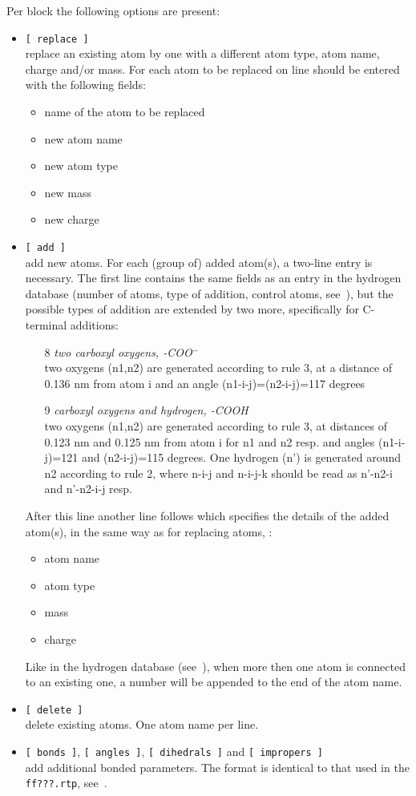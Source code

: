 Per block the following options are present:
\begin{itemize}
\item {\tt [~replace~]} \\
replace an existing atom by one with a different atom type, atom name,
charge and/or mass. For each atom to be replaced on line should be
entered with the following fields:
\begin{itemize}
\item name of the atom to be replaced
\item new atom name
\item new atom type
\item new mass
\item new charge
\end{itemize}
\item {\tt [~add~]} \\
add new atoms. For each (group of) added atom(s), a two-line entry is
necessary. The first line contains the same fields as an entry in the
hydrogen database (number of atoms, type of addition, control atoms,
see~), but the possible types of addition are extended
by two more, specifically for C-terminal additions:
\begin{enumerate}
\item[8]{\em two carboxyl oxygens, -COO{$^-$}}\\
two oxygens (n1,n2) are generated according to rule 3, at a distance
of 0.136 nm from atom i and an angle (n1-i-j)=(n2-i-j)=117 degrees
\item[9]{\em carboxyl oxygens and hydrogen, -COOH}\\
two oxygens (n1,n2) are generated according to rule 3, at distances of
0.123 nm and 0.125 nm from atom i for n1 and n2 resp. and angles
(n1-i-j)=121 and (n2-i-j)=115 degrees. One hydrogen (n') is generated
around n2 according to rule 2, where n-i-j and n-i-j-k should be read
as n'-n2-i and n'-n2-i-j resp.
\end{enumerate}
After this line another line follows which specifies the details of
the added atom(s), in the same way as for replacing atoms, {\ie}: 
\begin{itemize}
\item atom name
\item atom type
\item mass
\item charge
\end{itemize}
Like in the hydrogen database (see~), when more then
one atom is connected to an existing one, a number will be appended to
the end of the atom name.
\item {\tt [~delete~]}\\
delete existing atoms. One atom name per line.
\item {\tt [~bonds~]}, {\tt [~angles~]}, {\tt [~dihedrals~]} and {\tt [~impropers~]}\\
add additional bonded parameters. The format is identical to that used
in the {\tt ff???.rtp}, see~.
\end{itemize}

